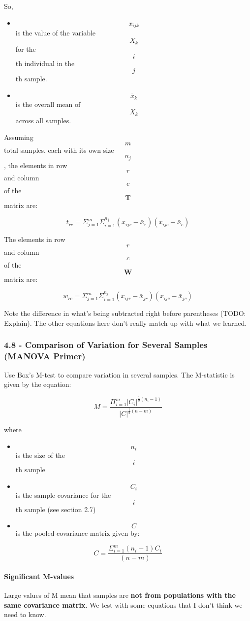 So,

\begin{itemize}
\tightlist
\item
  \[x_{ijk}\] is the value of the variable \[X_k\] for the \[i\]th
  individual in the \[j\]th sample.
\item
  \[\bar{x}_k\] is the overall mean of \[X_k\] across all samples.
\end{itemize}

Assuming \[m\] total samples, each with its own size \[n_j\], the
elements in row \[r\] and column \[c\] of the \[\textbf{T}\] matrix are:

\[t_{rc} = \Sigma_{j = 1}^m \Sigma_{i = 1}^{n_j} (x_{ijr} - \bar{x}_r)(x_{ijc} - \bar{x}_c)\]

The elements in row \[r\] and column \[c\] of the \[\textbf{W}\] matrix
are:

\[w_{rc} = \Sigma_{j = 1}^m \Sigma_{i = 1}^{n_j} (x_{ijr} - \bar{x}_{jr})(x_{ijc} - \bar{x}_{jc})\]

Note the difference in what's being subtracted right before parentheses
(TODO: Explain). The other equations here don't really match up with
what we learned.

\hypertarget{comparison-of-variation-for-several-samples-manova-primer}{%
\subsubsection{4.8 - Comparison of Variation for Several Samples (MANOVA
Primer)}\label{comparison-of-variation-for-several-samples-manova-primer}}

Use Box's M-test to compare variation in several samples. The
M-statistic is given by the equation:

\[M = \frac{\Pi_{i = 1}^m | C_i | ^ {\frac{1}{2}(n_i - 1)}} {| C | ^ {\frac{1}{2} (n - m)}}\]

where

\begin{itemize}
\tightlist
\item
  \[n_i\] is the size of the \[i\]th sample
\item
  \[C_i\] is the sample covariance for the \[i\]th sample (see section
  2.7)
\item
  \[C\] is the pooled covariance matrix given by:
\end{itemize}

\[C = \frac{\Sigma_{i = 1}^m (n_i - 1) C_i}{(n - m)}\]

\hypertarget{significant-m-values}{%
\paragraph{Significant M-values}\label{significant-m-values}}

Large values of M mean that samples are \textbf{not from populations
with the same covariance matrix}. We test with some equations that I
don't think we need to know.
